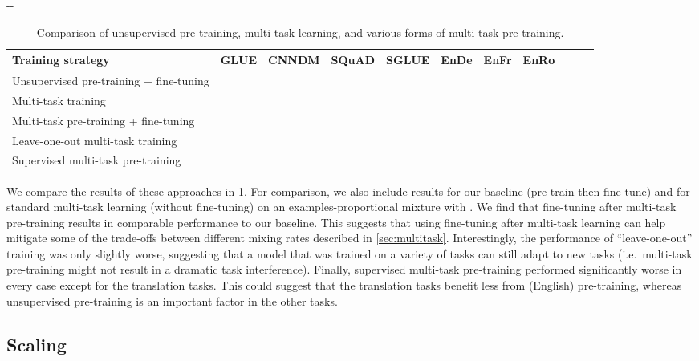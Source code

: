 \documentclass[twoside,11pt]{article}
\newlength{\offsetpage}
\newenvironment{widepage}{\begin{adjustwidth}{-\offsetpage}{-\offsetpage}\addtolength{\textwidth}{2\offsetpage}}{\end{adjustwidth}}
\newcommand{\bsl}{\makebox[0pt][r]{\raisebox{0.05em}{}}}
\begin{document}
\begin{table}
\footnotesize
\begin{widepage}
\centering
\begin{tabular}{l c c c c c c c c c c}
\toprule
    Training strategy                             & GLUE        & CNNDM       & SQuAD       & SGLUE       & EnDe        & EnFr        & EnRo    \\
\midrule
    \bsl Unsupervised pre-training + fine-tuning  &  &  &  &  &  &      &  \\
    Multi-task training                            &      &  &      &      &      &      &  \\
    Multi-task pre-training + fine-tuning          &  &  &  &  &  &      &  \\
    Leave-one-out multi-task training              &      &      &      &  &  &      &       \\
    Supervised multi-task pre-training             &      &      &      &      &      &  &  \\
\bottomrule
\end{tabular}
\end{widepage}
\caption{
Comparison of unsupervised pre-training, multi-task learning, and various forms of multi-task pre-training.
}
\label{tab:multitask_ft}
\end{table}

We compare the results of these approaches in \cref{tab:multitask_ft}.
For comparison, we also include results for our baseline (pre-train then fine-tune) and for standard multi-task learning (without fine-tuning) on an examples-proportional mixture with .
We find that fine-tuning after multi-task pre-training results in comparable performance to our baseline.
This suggests that using fine-tuning after multi-task learning can help mitigate some of the trade-offs between different mixing rates described in \cref{sec:multitask}.
Interestingly, the performance of ``leave-one-out'' training was only slightly worse, suggesting that a model that was trained on a variety of tasks can still adapt to new tasks (i.e.\ multi-task pre-training might not result in a dramatic task interference).
Finally, supervised multi-task pre-training performed significantly worse in every case except for the translation tasks.
This could suggest that the translation tasks benefit less from (English) pre-training, whereas unsupervised pre-training is an important factor in the other tasks.

\subsection{Scaling}
\label{sec:scaling}
\end{document}
